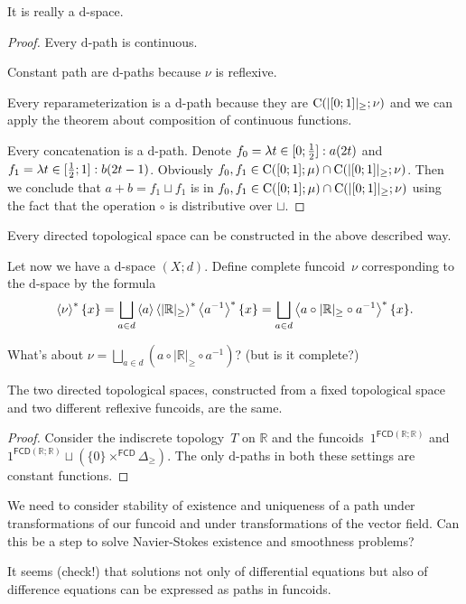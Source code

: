 \begin{prop}
It is really a $\mathrm{d}$-space.
\end{prop}

\begin{proof}
Every $\mathrm{d}$-path is continuous.

Constant path are $\mathrm{d}$-paths because $\nu$ is reflexive.

Every reparameterization is a $\mathrm{d}$-path because they are $\mathrm{C}(|[0;1]|_{\geq}; \nu)$ and we can apply the theorem about
composition of continuous functions.

Every concatenation is a $\mathrm{d}$-path. Denote
$f_0 = \lambda t\in[0;\frac{1}{2}]:a(2t)$ and $f_1 = \lambda t\in[\frac{1}{2};1]:b(2t-1)$.
Obviously $f_0,f_1 \in \mathrm{C}([0;1];\mu) \cap \mathrm{C}(|[0;1]|_{\geq}; \nu)$.
Then we conclude that $a+b = f_1\sqcup f_1$ is in $f_0,f_1 \in \mathrm{C}([0;1];\mu) \cap \mathrm{C}(|[0;1]|_{\geq}; \nu)$
using the fact that the operation $\circ$ is distributive over $\sqcup$.
\end{proof}

\begin{conjecture}
Every directed topological space can be constructed in the above described way.
\end{conjecture}

Let now we have a $\mathrm{d}$-space $(X;d)$. Define complete funcoid~$\nu$ corresponding to the $\mathrm{d}$-space by the formula
\[ \rsupfun{\nu}\{x\} = \bigsqcup_{a\in d}\supfun{a}\rsupfun{|\mathbb{R}|_{\geq}}\rsupfun{a^{-1}}\{x\} =
\bigsqcup_{a\in d}\rsupfun{a\circ |\mathbb{R}|_{\geq}\circ a^{-1}}\{x\}. \]

What's about $\nu = \bigsqcup_{a\in d}(a\circ |\mathbb{R}|_{\geq}\circ a^{-1})$? (but is it complete?)

\begin{example}
The two directed topological spaces, constructed from a fixed topological space and two different reflexive funcoids,
are the same.
\end{example}

\begin{proof}
Consider the indiscrete topology~$T$ on $\mathbb{R}$ and the funcoids~$1^{\mathsf{FCD}(\mathbb{R};\mathbb{R})}$
and $1^{\mathsf{FCD}(\mathbb{R};\mathbb{R})}\sqcup(\{0\}\times^{\mathsf{FCD}} \Delta_{\geq})$.
The only $\mathrm{d}$-paths in both these settings are constant functions.
\end{proof}

We need to consider stability of existence and uniqueness of a path under transformations of our funcoid and
under transformations of the vector field. Can this be a step to solve Navier-Stokes existence and smoothness problems?

It seems (check!) that solutions not only of differential equations but also of difference equations can be
expressed as paths in funcoids.